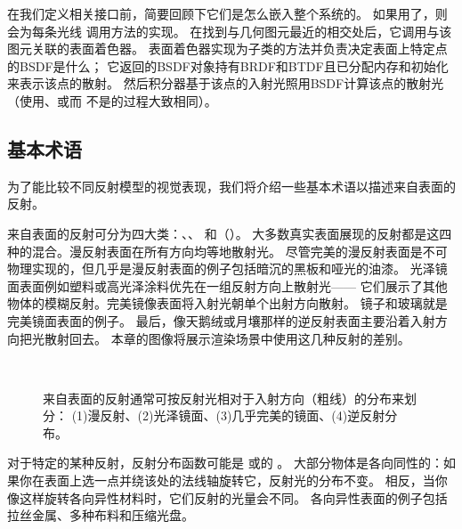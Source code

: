 在我们定义相关接口前，简要回顾下它们是怎么嵌入整个系统的。
如果用了，则会为每条光线
调用方法的实现。
在找到与几何图元最近的相交处后，它调用与该图元关联的表面着色器。
表面着色器实现为子类的方法并负责决定表面上特定点的BSDF是什么；
它返回的BSDF对象持有BRDF和BTDF且已分配内存和初始化来表示该点的散射。
然后积分器基于该点的入射光照用BSDF计算该点的散射光
（使用、或而
不是的过程大致相同）。

\subsection{基本术语}\label{sub:基本术语}
为了能比较不同反射模型的视觉表现，我们将介绍一些基本术语以描述来自表面的反射。

来自表面的反射可分为四大类：、、
和（）。
大多数真实表面展现的反射都是这四种的混合。漫反射表面在所有方向均等地散射光。
尽管完美的漫反射表面是不可物理实现的，但几乎是漫反射表面的例子包括暗沉的黑板和哑光的油漆。
光泽镜面表面例如塑料或高光泽涂料优先在一组反射方向上散射光——
它们展示了其他物体的模糊反射。完美镜像表面将入射光朝单个出射方向散射。
镜子和玻璃就是完美镜面表面的例子。
最后，像天鹅绒或月壤那样的逆反射表面主要沿着入射方向把光散射回去。
本章的图像将展示渲染场景中使用这几种反射的差别。
\begin{figure}[htbp]
      \centering
      \\
      \caption{来自表面的反射通常可按反射光相对于入射方向（粗线）的分布来划分：
            (1)漫反射、(2)光泽镜面、(3)几乎完美的镜面、(4)逆反射分布。}
      \label{fig:8.1}
\end{figure}

对于特定的某种反射，反射分布函数可能是
或的
。
大部分物体是各向同性的：如果你在表面上选一点并绕该处的法线轴旋转它，反射光的分布不变。
相反，当你像这样旋转各向异性材料时，它们反射的光量会不同。
各向异性表面的例子包括拉丝金属、多种布料和压缩光盘。

